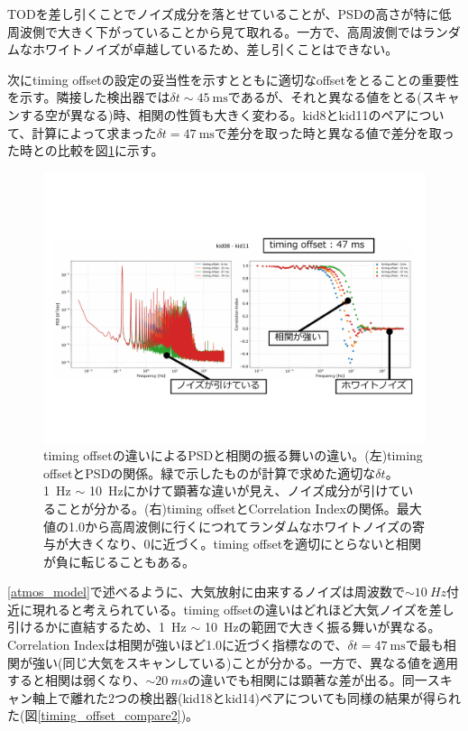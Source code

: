 TODを差し引くことでノイズ成分を落とせていることが、PSDの高さが特に低周波側で大きく下がっていることから見て取れる。一方で、高周波側ではランダムなホワイトノイズが卓越しているため、差し引くことはできない。

次にtiming offsetの設定の妥当性を示すとともに適切なoffsetをとることの重要性を示す。隣接した検出器では$\delta t\sim\SI{45}{\mathrm{ms}}$であるが、それと異なる値をとる(スキャンする空が異なる)時、相関の性質も大きく変わる。kid8とkid11のペアについて、計算によって求まった$\delta t=\SI{47}{\mathrm{ms}}$で差分を取った時と異なる値で差分を取った時との比較を図\ref{timing_offset_compare}に示す。
\begin{figure}[htbp]
  \centering
  \includegraphics[width=1.05\columnwidth]{5_alignment/figs/timing_offset_compare.pdf}
  \caption{timing offsetの違いによるPSDと相関の振る舞いの違い。(左)timing offsetとPSDの関係。緑で示したものが計算で求めた適切な$\delta t$。\SI{1}{Hz} $\sim$ \SI{10}{Hz}にかけて顕著な違いが見え、ノイズ成分が引けていることが分かる。(右)timing offsetとCorrelation Indexの関係。最大値の1.0から高周波側に行くにつれてランダムなホワイトノイズの寄与が大きくなり、0に近づく。timing offsetを適切にとらないと相関が負に転じることもある。}
  \label{timing_offset_compare}
\end{figure}
\ref{atmos_model}で述べるように、大気放射に由来するノイズは周波数で$\sim\SI{10}{Hz}$付近に現れると考えられている。timing offsetの違いはどれほど大気ノイズを差し引けるかに直結するため、\SI{1}{Hz} $\sim$ \SI{10}{Hz}の範囲で大きく振る舞いが異なる。Correlation Indexは相関が強いほど1.0に近づく指標なので、$\delta t=\SI{47}{\mathrm{ms}}$で最も相関が強い(同じ大気をスキャンしている)ことが分かる。一方で、異なる値を適用すると相関は弱くなり、$\sim\SI{20}{ms}$の違いでも相関には顕著な差が出る。同一スキャン軸上で離れた2つの検出器(kid18とkid14)ペアについても同様の結果が得られた(図\ref{timing_offset_compare2})。
